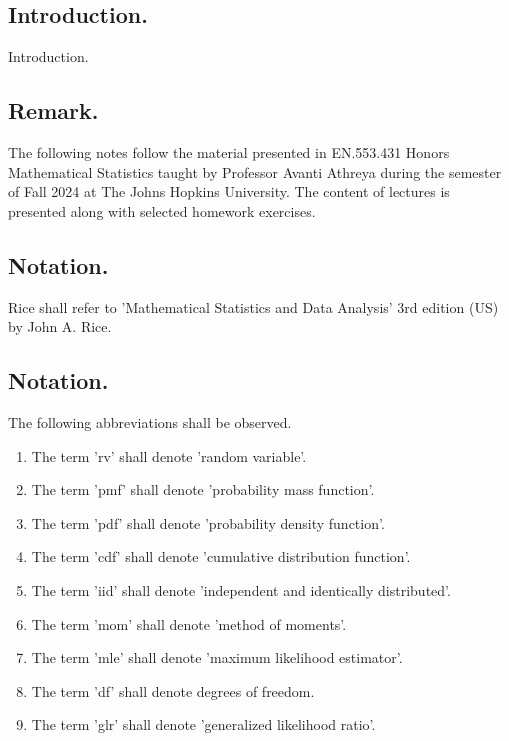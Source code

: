 \documentclass[titlepage]{article}
\begin{document}
\maketitle

\tableofcontents

\newpage {}

\subsection{Introduction.} Introduction.

\subsection{Remark.} The following notes follow the material presented in EN.553.431 Honors Mathematical Statistics taught by Professor Avanti Athreya during the semester of Fall 2024 at The Johns Hopkins University. The content of lectures is presented along with selected homework exercises.

\subsection{Notation.} Rice shall refer to 'Mathematical Statistics and Data Analysis' 3rd edition (US) by John A. Rice.

\subsection{Notation.} The following abbreviations shall be observed.
\begin{enumerate}
\item The term 'rv' shall denote 'random variable'.
\item The term 'pmf' shall denote 'probability mass function'.
\item The term 'pdf' shall denote 'probability density function'.
\item The term 'cdf' shall denote 'cumulative distribution function'.
\item The term 'iid' shall denote 'independent and identically distributed'.
\item The term 'mom' shall denote 'method of moments'.
\item The term 'mle' shall denote 'maximum likelihood estimator'.
\item The term 'df' shall denote degrees of freedom.
\item The term 'glr' shall denote 'generalized likelihood ratio'.
\end{enumerate}
\end{document}
